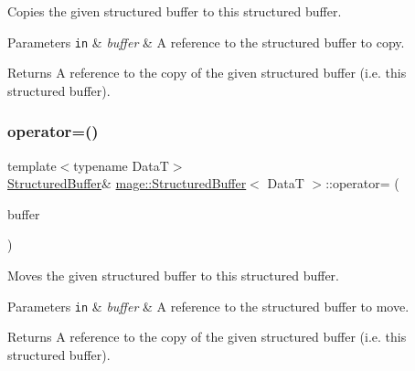 Copies the given structured buffer to this structured buffer.


\begin{DoxyParams}[1]{Parameters}
\mbox{\tt in}  & {\em buffer} & A reference to the structured buffer to copy. \\
\hline
\end{DoxyParams}
\begin{DoxyReturn}{Returns}
A reference to the copy of the given structured buffer (i.\+e. this structured buffer). 
\end{DoxyReturn}
\hypertarget{structmage_1_1_structured_buffer_a2647510e153d15b89f860e2a5c68e231}{}\label{structmage_1_1_structured_buffer_a2647510e153d15b89f860e2a5c68e231} 
\subsubsection{\texorpdfstring{operator=()}{operator=()}\hspace{0.1cm}{\footnotesize\ttfamily [2/2]}}
{\footnotesize\ttfamily template$<$typename DataT$>$ \\
\hyperlink{structmage_1_1_structured_buffer}{Structured\+Buffer}\& \hyperlink{structmage_1_1_structured_buffer}{mage\+::\+Structured\+Buffer}$<$ DataT $>$\+::operator= (\begin{DoxyParamCaption}\item[{\hyperlink{structmage_1_1_structured_buffer}{Structured\+Buffer}$<$ DataT $>$ \&\&}]{buffer }\end{DoxyParamCaption})\hspace{0.3cm}{\ttfamily [delete]}}

Moves the given structured buffer to this structured buffer.


\begin{DoxyParams}[1]{Parameters}
\mbox{\tt in}  & {\em buffer} & A reference to the structured buffer to move. \\
\hline
\end{DoxyParams}
\begin{DoxyReturn}{Returns}
A reference to the copy of the given structured buffer (i.\+e. this structured buffer). 
\end{DoxyReturn}
\hypertarget{structmage_1_1_structured_buffer_a1bf9c6db5b4ebb5333f15b5ee478e79d}{}\label{structmage_1_1_structured_buffer_a1bf9c6db5b4ebb5333f15b5ee478e79d} 
